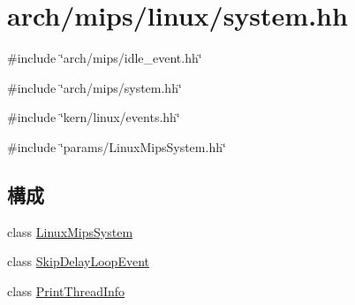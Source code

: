 \hypertarget{arch_2mips_2linux_2system_8hh}{
\section{arch/mips/linux/system.hh}
\label{arch_2mips_2linux_2system_8hh}
}
{\ttfamily \#include \char`\"{}arch/mips/idle\_\-event.hh\char`\"{}}\par
{\ttfamily \#include \char`\"{}arch/mips/system.hh\char`\"{}}\par
{\ttfamily \#include \char`\"{}kern/linux/events.hh\char`\"{}}\par
{\ttfamily \#include \char`\"{}params/LinuxMipsSystem.hh\char`\"{}}\par
\subsection*{構成}
\begin{DoxyCompactItemize}
\item 
class \hyperlink{classLinuxMipsSystem}{LinuxMipsSystem}
\item 
class \hyperlink{classLinuxMipsSystem_1_1SkipDelayLoopEvent}{SkipDelayLoopEvent}
\item 
class \hyperlink{classLinuxMipsSystem_1_1PrintThreadInfo}{PrintThreadInfo}
\end{DoxyCompactItemize}
